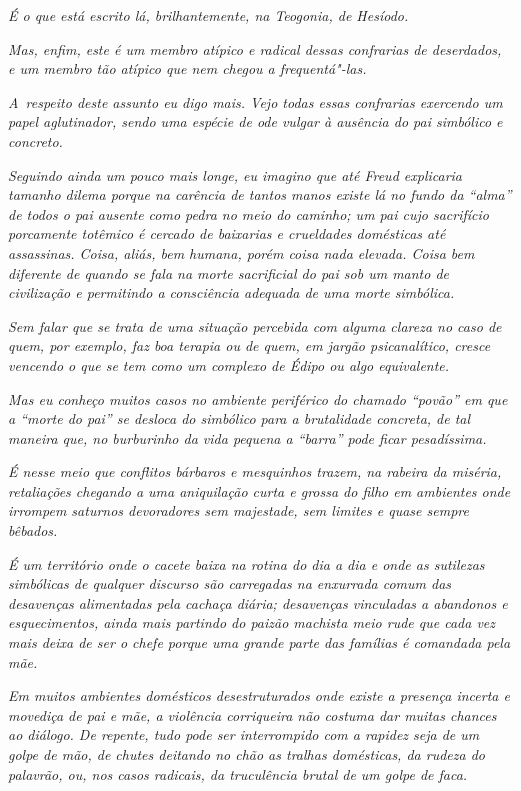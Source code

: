 \emph{É o que está escrito lá, brilhantemente, na Teogonia, de
Hesíodo.}~

\emph{Mas, enfim, este  é um membro atípico e radical dessas
confrarias de deserdados, e um membro tão atípico que nem chegou a
frequentá"-las.}~

\emph{A~respeito deste assunto eu digo mais. Vejo todas essas confrarias
exercendo um papel aglutinador, sendo uma espécie de ode vulgar à
ausência do pai simbólico e concreto.}~

\emph{Seguindo ainda um pouco mais longe, eu imagino que até Freud
explicaria tamanho dilema porque na carência de tantos manos existe lá
no fundo da ``alma'' de todos o pai ausente como pedra no meio do
caminho; um pai cujo sacrifício porcamente totêmico é cercado de
baixarias e crueldades domésticas até assassinas. Coisa, aliás, bem
humana, porém coisa nada elevada. Coisa bem diferente de quando se fala
na morte sacrificial do pai sob um manto de civilização e permitindo a
consciência adequada de uma morte simbólica.}~

\emph{Sem falar que se trata de uma situação percebida com alguma
clareza no caso de quem, por exemplo, faz boa terapia ou de quem, em
jargão psicanalítico, cresce vencendo o que se tem como um complexo de
Édipo ou algo equivalente.}~

\emph{Mas eu conheço muitos casos no ambiente periférico do chamado
``povão'' em que a ``morte do pai'' se desloca do simbólico para a
brutalidade concreta, de tal maneira que, no burburinho da vida pequena
a ``barra'' pode ficar pesadíssima.}~

\emph{É nesse meio que conflitos bárbaros e mesquinhos trazem, na
rabeira da miséria, retaliações chegando a uma aniquilação curta e
grossa do filho em ambientes onde irrompem saturnos devoradores sem
majestade, sem limites e quase sempre bêbados.}~

\emph{É um território onde o cacete baixa na rotina do dia a dia e onde
as sutilezas simbólicas de qualquer discurso são carregadas na enxurrada
comum das desavenças alimentadas pela cachaça diária; desavenças
vinculadas a abandonos e esquecimentos, ainda mais partindo do paizão
machista meio rude que cada vez mais deixa de ser o chefe porque uma
grande parte das famílias é comandada pela mãe.}~

\emph{Em muitos ambientes domésticos desestruturados onde existe a
presença incerta e movediça de pai e mãe, a violência corriqueira não
costuma dar muitas chances ao diálogo. De repente, tudo pode ser
interrompido com a rapidez seja de um golpe de mão, de chutes deitando
no chão as tralhas domésticas, da rudeza do palavrão, ou, nos casos
radicais, da truculência brutal de um golpe de faca.}~

